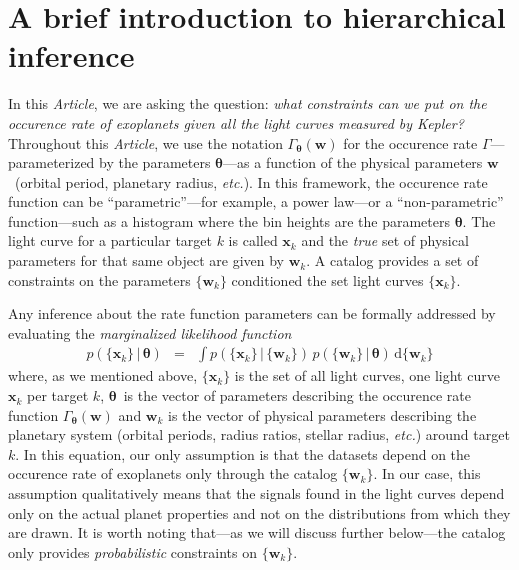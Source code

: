 \documentclass[12pt,preprint]{aastex}
\newcommand{\project}[1]{{\sffamily #1}}
\newcommand{\kepler}{\project{Kepler}}
\newcommand{\paper}{\textsl{Article}}
\newcommand{\foreign}[1]{\emph{#1}}
\newcommand{\etc}{\foreign{etc.}}
\newcommand{\eqlabel}[1]{\label{eq:#1}}
\newcommand{\dd}{\ensuremath{\,\mathrm{d}}}
\newcommand{\bvec}[1]{\ensuremath{\boldsymbol{#1}}}
\newcommand{\rate}{\ensuremath{\Gamma}}
\newcommand{\ratepar}{{\ensuremath{\theta}}}
\newcommand{\ratepars}{{\ensuremath{\bvec{\ratepar}}}}
\newcommand{\data}{{\ensuremath{\bvec{x}}}}
\newcommand{\entry}{{\ensuremath{\bvec{w}}}}
\begin{document}
\section{A brief introduction to hierarchical inference}

In this \paper, we are asking the question: \emph{what constraints can we put
on the occurence rate of exoplanets given all the light curves measured by
\kepler?}
Throughout this \paper, we use the notation $\rate_\ratepars(\entry)$ for the
occurence rate \rate---parameterized by the parameters \ratepars---as a
function of the physical parameters \entry\ (orbital period, planetary radius,
\etc).
In this framework, the occurence rate function can be ``parametric''---for
example, a power law---or a ``non-parametric'' function---such as a histogram
where the bin heights are the parameters \ratepars.
The light curve for a particular target $k$ is called $\data_k$ and the
\emph{true} set of physical parameters for that same object are given by
$\entry_k$.
A catalog provides a set of constraints on the parameters $\{\entry_k\}$
conditioned the set light curves $\{\data_k\}$.

Any inference about the rate function parameters can be formally addressed by
evaluating the \emph{marginalized likelihood function}
\begin{eqnarray}\eqlabel{crazylike}
p(\{\data_k\}\,|\,\ratepars) &=&
    \int p(\{\data_k\}\,|\,\{\entry_k\})
    \,p(\{\entry_k\}\,|\,\ratepars)
    \dd\{\entry_k\}
\end{eqnarray}
where, as we mentioned above, $\{\data_k\}$ is the set of all light curves,
one light curve $\data_k$ per target $k$, \ratepars\ is the vector of
parameters describing the occurence rate function $\rate_\ratepars(\entry)$
and $\entry_k$ is the vector of physical parameters describing the planetary
system (orbital periods, radius ratios, stellar radius, \etc) around target
$k$.
In this equation, our only assumption is that the datasets depend on the
occurence rate of exoplanets only through the catalog $\{\entry_k\}$.
In our case, this assumption qualitatively means that the signals found in the
light curves depend only on the actual planet properties and not on the
distributions from which they are drawn.
It is worth noting that---as we will discuss further below---the catalog only
provides \emph{probabilistic} constraints on $\{\entry_k\}$.
\end{document}

